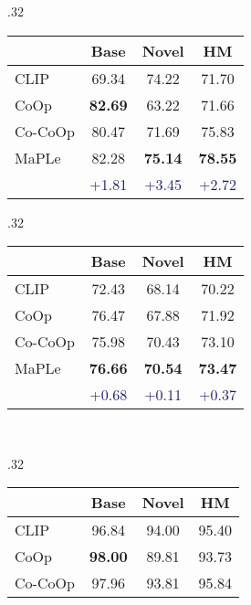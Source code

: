 \documentclass[10pt,twocolumn,letterpaper]{article}
\newcommand{\tableCellHeight}{1}
\newcommand{\tabstyle}[1]{
  \setlength{\tabcolsep}{#1}
  \renewcommand{\arraystretch}{\tableCellHeight}
  \centering
  \small
}
\newcommand{\tablestyle}[2]{\setlength{\tabcolsep}{#1}\renewcommand{\arraystretch}{#2}\centering\footnotesize}
\begin{document}
\begin{table*}[t!]
\tablestyle{6pt}{0}
\addtolength{\tabcolsep}{-6pt}
    \tabstyle{1.5pt}
    \setlength{\tabcolsep}{6pt}
    \begin{subtable}[t]{.32\textwidth}
    \centering
    \caption{\textbf{Average over 11 datasets}}
    \begin{tabular}{l cc|c}
    \toprule
    & Base & Novel & HM \\
    \midrule
    CLIP & 69.34 & 74.22 & 71.70 \\
    CoOp & \textbf{82.69} & 63.22 & 71.66 \\
    Co-CoOp & 80.47 & 71.69 & 75.83 \\
    \midrule
    \rowcolor{tabhighlight}
    MaPLe & 82.28 & \textbf{75.14} & \textbf{78.55} \\
     &  \textcolor{MidnightBlue}{{+1.81}} &  \textcolor{MidnightBlue}{{+3.45}} &  \textcolor{MidnightBlue}{{+2.72}} \\
    \bottomrule
    \end{tabular}
    \end{subtable}
    \vspace{1em}
    \begin{subtable}[t]{.32\textwidth}
    \centering
    \caption{ImageNet.}
    \begin{tabular}{l cc|c}
    \toprule
    & Base & Novel & HM \\
    \midrule
    CLIP & 72.43 & 68.14 & 70.22 \\
    CoOp & {76.47} & 67.88 & 71.92\\
    Co-CoOp & 75.98 & {70.43} & {73.10} \\
    \midrule
    \rowcolor{tabhighlight}
    MaPLe & \textbf{76.66} & \textbf{70.54} & \textbf{73.47} \\
      &  \textcolor{MidnightBlue}{{+0.68}} &  \textcolor{MidnightBlue}{{+0.11}} &  \textcolor{MidnightBlue}{{+0.37}} \\
    \bottomrule
    \end{tabular}
    \end{subtable}
    ~
    \begin{subtable}[t]{.32\textwidth}
    \centering
    \caption{Caltech101}
    \begin{tabular}{l cc|c}
    \toprule
    & Base & Novel & HM \\
    \midrule
    CLIP & 96.84 & {94.00} & 95.40 \\
    CoOp & \textbf{98.00} & 89.81 & 93.73 \\
    Co-CoOp & 97.96 & 93.81 & {95.84} \\

\end{tabular}
\end{subtable}
\end{table*}
\end{document}
